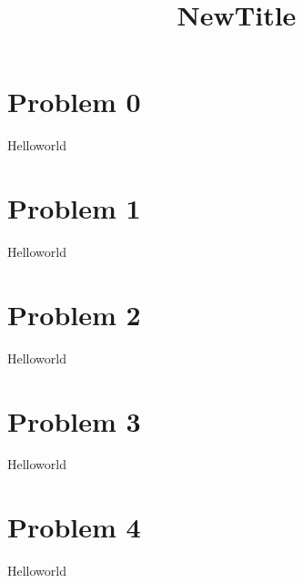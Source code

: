 \documentclass{article}
\title{NewTitle}
\begin{document}
 
\maketitle 
\section{Problem 0 } 
Helloworld 
\section{Problem 1 } 
Helloworld 
\section{Problem 2 } 
Helloworld 
\section{Problem 3 } 
Helloworld 
\section{Problem 4 } 
Helloworld 
\end{document}
